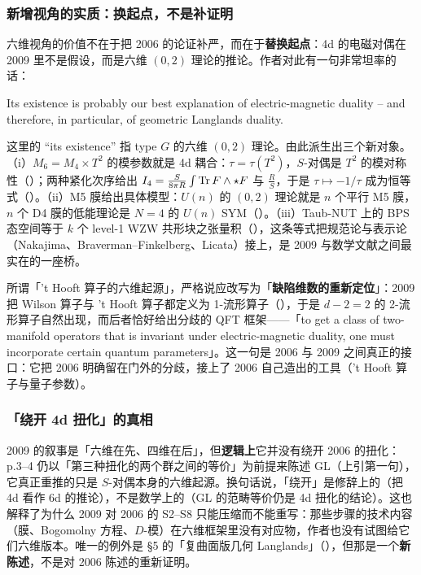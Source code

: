 \subsubsection*{新增视角的实质：换起点，不是补证明}

六维视角的价值不在于把 2006 的论证补严，而在于\textbf{替换起点}：4d 的电磁对偶在 2009 里不是假设，而是六维 $(0,2)$ 理论的推论。\pA 作者对此有一句非常坦率的话：\pA
\begin{origquote}
Its existence is probably our best explanation of electric-magnetic duality -- and therefore, in particular, of geometric Langlands duality. 
\end{origquote}
这里的 ``its existence'' 指 type $G$ 的六维 $(0,2)$ 理论。\pA 由此派生出三个新对象。（i）$M_6=M_4\times T^2$ 的模参数就是 4d 耦合：$\tau=\tau(T^2)$，$S$-对偶是 $T^2$ 的模对称性（）；两种紧化次序给出 $I_4=\frac{S}{8\pi R}\int\operatorname{Tr} F\wedge\star F$ 与 $\frac{R}{S}$，于是 $\tau\mapsto-1/\tau$ 成为恒等式（）。\pA（ii）M5 膜给出具体模型：$U(n)$ 的 $(0,2)$ 理论就是 $n$ 个平行 M5 膜，$n$ 个 D4 膜的低能理论是 $N=4$ 的 $U(n)$ SYM（）。\pA（iii）Taub-NUT 上的 BPS 态空间等于 $k$ 个 level-1 WZW 共形块之张量积（），这条等式把规范论与表示论（Nakajima、Braverman--Finkelberg、Licata）接上，是 2009 与数学文献之间最实在的一座桥。\pA

所谓「't Hooft 算子的六维起源」，严格说应改写为「\textbf{缺陷维数的重新定位}」：2009 把 Wilson 算子与 't Hooft 算子都定义为 1-流形算子（），于是 $d-2=2$ 的 2-流形算子自然出现，而后者恰好给出分歧的 QFT 框架——「to get a class of two-manifold operators that is invariant under electric-magnetic duality, one must incorporate certain quantum parameters」。\pA 这一句是 2006 与 2009 之间真正的接口：它把 2006 明确留在门外的分歧，接上了 2006 自己造出的工具（'t Hooft 算子与量子参数）。\pB

\subsubsection*{「绕开 4d 扭化」的真相}

2009 的叙事是「六维在先、四维在后」，但\textbf{逻辑上}它并没有绕开 2006 的扭化：p.3--4 仍以「第三种扭化的两个群之间的等价」为前提来陈述 GL（上引第一句），它真正重推的只是 $S$-对偶本身的六维起源。\pC 换句话说，「绕开」是修辞上的（把 4d 看作 6d 的推论），不是数学上的（GL 的范畴等价仍是 4d 扭化的结论）。\pC 这也解释了为什么 2009 对 2006 的 S2--S8 只能压缩而不能重写：那些步骤的技术内容（膜、Bogomolny 方程、$D$-模）在六维框架里没有对应物，作者也没有试图给它们六维版本。\pC 唯一的例外是 §5 的「复曲面版几何 Langlands」（），但那是一个\textbf{新陈述}，不是对 2006 陈述的重新证明。\pA

